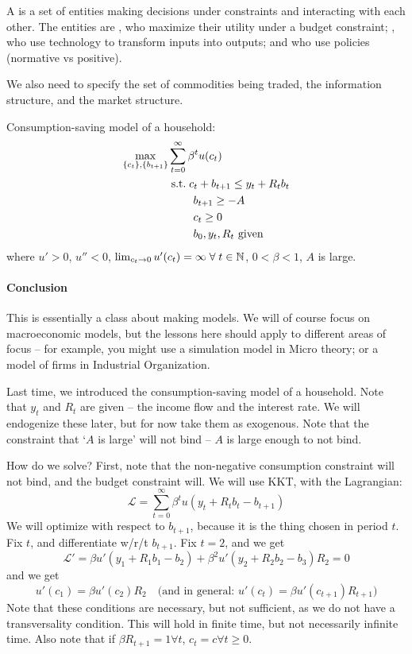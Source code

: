 \documentclass[10pt]{article}
\begin{document}
\medskip

\begin{definition}
	A  is a set of entities making decisions under constraints and interacting with each other. The entities are , who maximize their utility under a budget constraint; , who use technology to transform inputs into outputs; and  who use policies (normative vs positive).
	
	We also need to specify the set of commodities being traded, the information structure, and the market structure. 
\end{definition}

\begin{model} 
	Consumption-saving model of a household:
	\begin{align*}
		\max_{\{c_t\},\{b_{t+1}\}} &\sum_{t=0}^\infty \beta^t u(c_t) \\
		&\;\text{s.t.}\; c_t + b_{t+1} \le y_t + R_t b_t \\
		&\qquad\; b_{t+1} \ge -A \\
		&\qquad\; c_t \ge 0 \\
		&\qquad\; b_0,y_t,R_t \text{ given}
	\end{align*}
	where $u' > 0$, $u'' < 0$, $\lim_{c_t\to 0} u'(c_t) = \infty \forall t \in \naturals$, $0 < \beta < 1$, $A$ is large.
\end{model}


\paragraph{Conclusion} This is essentially a class about making models. We will of course focus on macroeconomic models, but the lessons here should apply to different areas of focus -- for example, you might use a simulation model in Micro theory; or a model of firms in Industrial Organization.

Last time, we introduced the consumption-saving model of a household. Note that $y_t$ and $R_t$ are given -- the income flow and the interest rate. We will endogenize these later, but for now take them as exogenous. Note that the constraint that `$A$ is large' will not bind -- $A$ is large enough to not bind. 

How do we solve? First, note that the non-negative consumption constraint will not bind, and the budget constraint will. We will use KKT, with the Lagrangian:
\[
\mathcal{L} = \sum_{t=0}^\infty \beta^t u(y_t + R_t b_t - b_{t+1})
\]
We will optimize with respect to $b_{t+1}$, because it is the thing chosen in period $t$. Fix $t$, and differentiate w/r/t $b_{t+1}$. Fix $t = 2$, and we get
\[
\mathcal{L}' = \beta u'(y_1 + R_1 b_1 - b_2) + \beta^2 u'(y_2 + R_2 b_2 - b_3) R_2 = 0
\]
and we get
\[
u'(c_1) = \beta u'(c_2) R_2 \quad\text{(and in general: } u'(c_t) = \beta u'(c_{t+1}) R_{t+1})
\]
Note that these conditions are necessary, but not sufficient, as we do not have a transversality condition. This will hold in finite time, but not necessarily infinite time. Also note that if $\beta R_{t+1} = 1 \forall t$, $c_t = c \forall t \ge 0$.  
\end{document}
